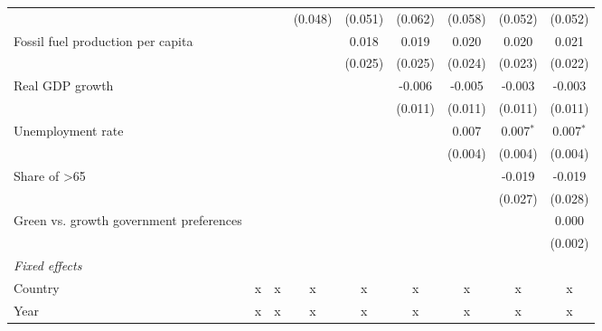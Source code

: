 \begin{table}[htbp]
\begin{tabular}{lcccccccc}
                                              &                &               & (0.048) & (0.051)      & (0.062)      & (0.058)      & (0.052)       & (0.052)\\   
      Fossil fuel production per capita       &                &               &         & 0.018        & 0.019        & 0.020        & 0.020         & 0.021\\   
                                              &                &               &         & (0.025)      & (0.025)      & (0.024)      & (0.023)       & (0.022)\\   
      Real GDP growth                         &                &               &         &              & -0.006       & -0.005       & -0.003        & -0.003\\   
                                              &                &               &         &              & (0.011)      & (0.011)      & (0.011)       & (0.011)\\   
      Unemployment rate                       &                &               &         &              &              & 0.007        & 0.007$^{*}$   & 0.007$^{*}$\\   
                                              &                &               &         &              &              & (0.004)      & (0.004)       & (0.004)\\   
      Share of >65                            &                &               &         &              &              &              & -0.019        & -0.019\\   
                                              &                &               &         &              &              &              & (0.027)       & (0.028)\\   
      Green vs. growth government preferences &                &               &         &              &              &              &               & 0.000\\   
                                              &                &               &         &              &              &              &               & (0.002)\\   
      \emph{Fixed effects}\\
      Country                                 & x              & x             & x       & x            & x            & x            & x             & x\\  
      Year                                    & x              & x             & x       & x            & x            & x            & x             & x\\  

\end{tabular}
\end{table}
